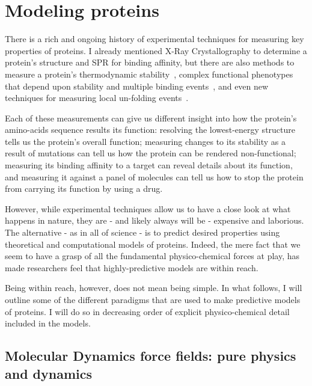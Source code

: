 \section{Modeling proteins}


There is a rich and ongoing history of experimental techniques for measuring key properties of proteins.
I already mentioned X-Ray Crystallography to determine a protein's structure and SPR for binding affinity,
but there are also methods to measure a protein's thermodynamic stability~\citep{tsuboyama_mega-scale_2023}, complex functional phenotypes
that depend upon stability and multiple binding events~\citep{tan_high-throughput_2023}, and even new techniques
for measuring local un-folding events~\citep{ferrari_large-scale_2025}.

Each of these measurements can give us different insight into how the protein's amino-acids sequence results its function:
resolving the lowest-energy structure tells us the protein's overall function; measuring changes to its stability as 
a result of mutations can tell us how the protein can be rendered non-functional; measuring its binding affinity
to a target can reveal details about its function, and measuring it against a panel of molecules can tell us how to
stop the protein from carrying its function by using a drug.

However, while experimental techniques allow us to have a close look at what happens in nature, they are
- and likely always will be - expensive and laborious.
The alternative - as in all of science - is to predict desired properties using theoretical and computational
models of proteins.
Indeed, the mere fact that we seem to have a grasp of all the fundamental physico-chemical forces at play,
has made researchers feel that highly-predictive models are within reach.

Being within reach, however, does not mean being simple.
In what follows, I will outline some of the different paradigms that are used to make predictive models of proteins.
I will do so in decreasing order of explicit physico-chemical detail included in the models.


\subsection{Molecular Dynamics force fields: pure physics and dynamics}


